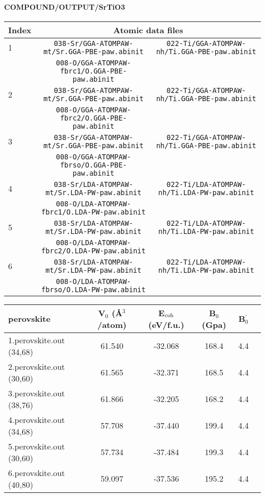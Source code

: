 \documentclass[onecolumn]{revtex4}
\begin{document}
\paragraph*{\bf{COMPOUND/OUTPUT/SrTiO3}}
\begin{center}
\begin{tabular}{lcc}
\hline
Index & \multicolumn{2}{c}{Atomic data files} \\
\hline
1 & \verb?038-Sr/GGA-ATOMPAW-mt/Sr.GGA-PBE-paw.abinit? & \verb?022-Ti/GGA-ATOMPAW-nh/Ti.GGA-PBE-paw.abinit? \\
& \verb?008-O/GGA-ATOMPAW-fbrc1/O.GGA-PBE-paw.abinit? & \\
2 & \verb?038-Sr/GGA-ATOMPAW-mt/Sr.GGA-PBE-paw.abinit? & \verb?022-Ti/GGA-ATOMPAW-nh/Ti.GGA-PBE-paw.abinit? \\
& \verb?008-O/GGA-ATOMPAW-fbrc2/O.GGA-PBE-paw.abinit? & \\
3 & \verb?038-Sr/GGA-ATOMPAW-mt/Sr.GGA-PBE-paw.abinit? & \verb?022-Ti/GGA-ATOMPAW-nh/Ti.GGA-PBE-paw.abinit? \\
& \verb?008-O/GGA-ATOMPAW-fbrso/O.GGA-PBE-paw.abinit? & \\
4 & \verb?038-Sr/LDA-ATOMPAW-mt/Sr.LDA-PW-paw.abinit? & \verb?022-Ti/LDA-ATOMPAW-nh/Ti.LDA-PW-paw.abinit? \\
& \verb?008-O/LDA-ATOMPAW-fbrc1/O.LDA-PW-paw.abinit? & \\
5 & \verb?038-Sr/LDA-ATOMPAW-mt/Sr.LDA-PW-paw.abinit? & \verb?022-Ti/LDA-ATOMPAW-nh/Ti.LDA-PW-paw.abinit? \\
& \verb?008-O/LDA-ATOMPAW-fbrc2/O.LDA-PW-paw.abinit? & \\
6 & \verb?038-Sr/LDA-ATOMPAW-mt/Sr.LDA-PW-paw.abinit? & \verb?022-Ti/LDA-ATOMPAW-nh/Ti.LDA-PW-paw.abinit? \\
& \verb?008-O/LDA-ATOMPAW-fbrso/O.LDA-PW-paw.abinit? & \\
\hline
\end{tabular}
\end{center}
\begin{center}
\begin{tabular}{lccccc}
\hline
\hline
\bf{perovskite}&V$_0$ (\AA$^3$/atom)&E$_{\rm coh}$ (eV/f.u.)&B$_0$ (Gpa)&B$_0^{'}$& \\
\hline
1.perovskite.out (34,68)& 61.540 &-32.068 & 168.4 & 4.4 & \\ 
2.perovskite.out (30,60)& 61.565 &-32.371 & 168.5 & 4.4 & \\ 
3.perovskite.out (38,76)& 61.866 &-32.205 & 168.2 & 4.4 & \\ 
4.perovskite.out (34,68)& 57.708 &-37.440 & 199.4 & 4.4 & \\ 
5.perovskite.out (30,60)& 57.734 &-37.484 & 199.3 & 4.4 & \\ 
6.perovskite.out (40,80)& 59.097 &-37.536 & 195.2 & 4.4 & \\ 
\hline
\hline
\end{tabular}
\end{center}
\end{document}
